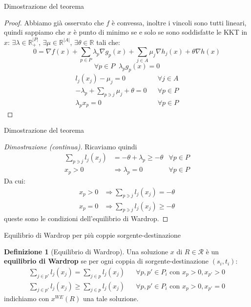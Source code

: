 \documentclass{beamer}
\newcounter{counter1}
\theoremstyle{plain}
\theoremstyle{definition}
\newtheorem{mydef}[counter1]{Definizione}
\theoremstyle{remark}
\newcommand{\abs}[1]{\left|#1\right|}
\begin{document}
\begin{frame}{Dimostrazione del teorema}
  \begin{proof}
    \renewcommand{\qedsymbol}{} Abbiamo già osservato che $f$ è
    convessa, inoltre i vincoli sono tutti lineari, quindi sappiamo
    che $x$ è punto di minimo se e solo se sono soddisfatte le KKT in
    $x$: $\exists \lambda \in \mathbb{R}_+^{\abs{P}}$,
    $\exists \mu \in \mathbb{R}^{\abs{A}}$,
    $\exists \theta \in \mathbb{R}$ tali che:
    \[ 0 = \nabla f(x) + \sum_{p\in P}\lambda _p \nabla g_p(x) + \sum _{j\in
        A} \mu _j \nabla h_j(x) + \theta \nabla h(x) \]
    \[ \forall p\in P\;\; \lambda _p g_p(x) = 0 \]
    \vspace{-20px}
    \begin{align*}
      l_j(x_j) - \mu _j =0 && \forall j\in A \\
      -\lambda _p + \sum _{p\ni j}\mu _j + \theta =0 && \forall p \in
                                                        P\\
      \lambda _p x_p =0 && \forall p\in P
    \end{align*}
  \end{proof}
\end{frame}

\begin{frame}{Dimostrazione del teorema}
  \begin{proof}[Dimostrazione (continua)]
    Ricaviamo quindi
    \begin{align*}
      \sum _{p\ni j} l_j(x_j) &= -\theta + \lambda _p \ge -\theta &
                                                \forall p\in P  \\
      x_p > 0 &\Rightarrow \lambda _p =0 & \forall p\in P
    \end{align*}
    Da cui:
    \begin{align*}
      x_p > 0 & \Rightarrow \sum _{p\ni j} l_j(x_j) = -\theta \\
      x_p = 0 & \Rightarrow \sum _{p\ni j} l_j(x_j) \ge -\theta
    \end{align*}
    queste sono le condizioni dell'equilibrio di Wardrop.
  \end{proof}
\end{frame}

\begin{frame}{Equilibrio di Wardrop per più coppie sorgente-destinazione}
  \begin{mydef}[Equilibrio di Wardrop]
    Una soluzione $x$ di $R\in \mathcal{R}$ è un \textbf{equilibrio di
      Wardrop} se per ogni coppia di sorgente-destinazione
    $(s_i,t_i)$:
    \begin{align*}
      \sum _{j\in p'} l_j(x_j) = \sum _{j\in p} l_j(x_j) & & \forall
                                                             p,p'\in P_i \text{ con } x_p >0, x_{p'} >0 \\
      \sum _{j\in p'} l_j(x_j) \ge \sum _{j\in p} l_j(x_j) & & \forall
                                                               p,p'\in P_i \text{ con } x_p >0, x_{p'} =0 
    \end{align*}
    indichiamo con $x^{WE}(R)$ una tale soluzione.
  \end{mydef}  
\end{frame}
\end{document}
